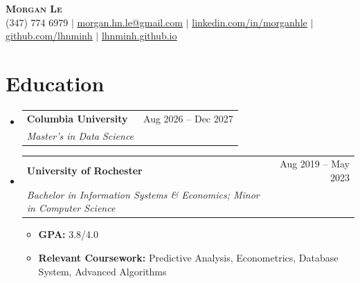 \documentclass[a4paper,10pt]{article}
\makeatletter
\newcommand{\resumeItem}[1]{
  \item\small{{#1 \vspace{-2pt}}}
}
\newcommand{\resumeSubheading}[4]{
  \vspace{-2pt}\item
    \begin{tabular*}{0.97\textwidth}[t]{l@{\extracolsep{\fill}}r}
      \small\textbf{#1} & \small #2 \\
      \textit{\small #3} & \textit{\small #4} \\
    \end{tabular*}\vspace{-7pt}
}
\newcommand{\resumeSubHeadingListStart}{\begin{itemize}[leftmargin=0.15in,label={}]}
\newcommand{\resumeSubHeadingListEnd}{\end{itemize}}
\newcommand{\resumeItemListStart}{\begin{itemize}[leftmargin=0.22in]}
\newcommand{\resumeItemListEnd}{\end{itemize}\vspace{-5pt}}
\makeatother
\begin{document}
\begin{center}
  \textbf{\Huge \scshape Morgan Le} \\ \vspace{2pt}
  \small (347) 774 6979 $|$
  \href{mailto:morgan.hn.le@gmail.com}{\underline{morgan.hn.le@gmail.com}} $|$
  \href{https://www.linkedin.com/in/morganhle/}{\underline{linkedin.com/in/morganhle}} $|$
  \href{https://github.com/lhnminh}{\underline{github.com/lhnminh}} $|$
  \href{https://lhnminh.github.io/}{\underline{lhnminh.github.io}}
\end{center}

\section{Education}
\resumeSubHeadingListStart
  \resumeSubheading
    {Columbia University}{Aug 2026 -- Dec 2027}
    {Master's in Data Science}{}
  \resumeSubheading
    {University of Rochester}{Aug 2019 -- May 2023}
    {Bachelor in Information Systems \& Economics; Minor in Computer Science}{}
    \resumeItemListStart
      \resumeItem{\textbf{GPA:} 3.8/4.0}
      \resumeItem{\textbf{Relevant Coursework:} Predictive Analysis, Econometrics, Database System, Advanced Algorithms}
    \resumeItemListEnd
\resumeSubHeadingListEnd
\end{document}
